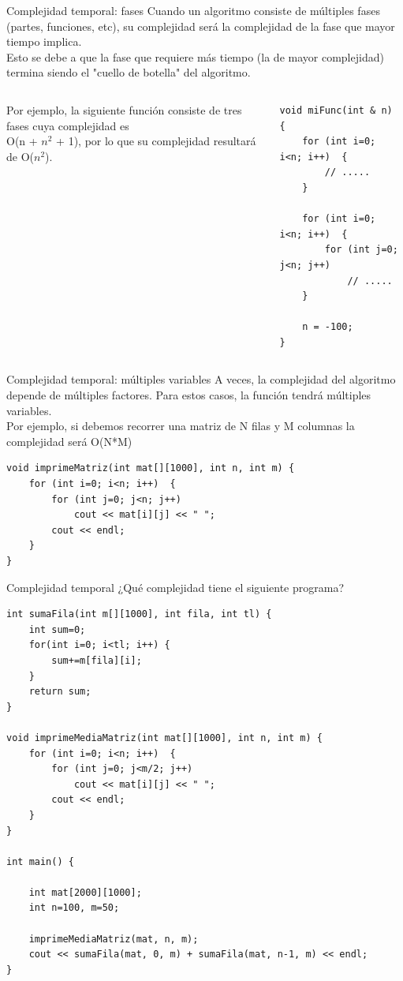 \documentclass[12pt]{beamer}
\begin{document}
\begin{frame}[fragile]{Complejidad temporal: fases}
    Cuando un algoritmo consiste de múltiples fases (partes, funciones, etc), su complejidad será la complejidad de la \alert{fase que mayor tiempo implica}. \\
    Esto se debe a que la fase que requiere más tiempo (la de mayor complejidad) termina siendo el "cuello de botella" del algoritmo. \\
    \medskip
    \begin{columns}
        Por ejemplo, la siguiente función consiste de tres fases cuya complejidad es \\ O(n + $n^2$ + 1), por lo que su complejidad resultará de O($n^2$).
        \begin{lstlisting}[basicstyle=\tiny]
void miFunc(int & n) {
    for (int i=0; i<n; i++)  {
        // .....
    } 
    
    for (int i=0; i<n; i++)  {
        for (int j=0; j<n; j++)
            // .....
    }
    
    n = -100;
}
\end{lstlisting}
    \end{columns}
\end{frame}

\begin{frame}[fragile]{Complejidad temporal: múltiples variables}
    A veces, la complejidad del algoritmo depende de múltiples factores. Para estos casos, la función tendrá múltiples variables. \\
    \medskip
    Por ejemplo, si debemos recorrer una matriz de N filas y M columnas la complejidad será O(\alert{N*M})
\begin{lstlisting}[basicstyle=\scriptsize]
void imprimeMatriz(int mat[][1000], int n, int m) {
    for (int i=0; i<n; i++)  {
        for (int j=0; j<n; j++)
            cout << mat[i][j] << " ";
        cout << endl;
    }
}
\end{lstlisting}
\end{frame}

\begin{frame}[fragile]{Complejidad temporal}
    \centering ¿Qué complejidad tiene el siguiente programa? \\
    \medskip
\begin{lstlisting}[basicstyle=\tiny]
int sumaFila(int m[][1000], int fila, int tl) {
    int sum=0;
    for(int i=0; i<tl; i++) {
        sum+=m[fila][i];
    }
    return sum;
}

void imprimeMediaMatriz(int mat[][1000], int n, int m) {
    for (int i=0; i<n; i++)  {
        for (int j=0; j<m/2; j++)
            cout << mat[i][j] << " ";
        cout << endl;
    }
}

int main() {

    int mat[2000][1000];
    int n=100, m=50;
    
    imprimeMediaMatriz(mat, n, m);
    cout << sumaFila(mat, 0, m) + sumaFila(mat, n-1, m) << endl;
}
\end{lstlisting}
\end{frame}
\end{document}
